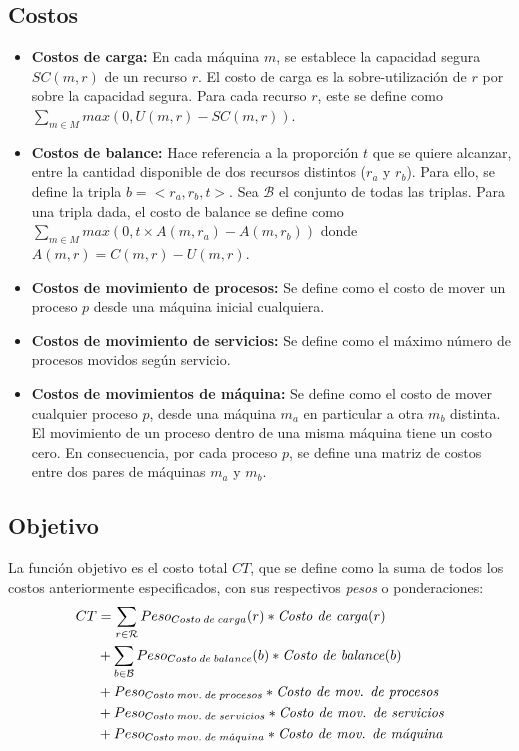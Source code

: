 \subsection{Costos}
\begin{itemize}
	
	\item \textbf{Costos de carga:} En cada máquina $m$, se establece la capacidad segura $SC(m,r)$ de un recurso $r$. El costo de carga es la sobre-utilización de $r$ por sobre la capacidad segura. Para cada recurso $r$, este se define como $\sum_{m \in M}max(0,U(m,r) - SC(m,r))$.
	
	\item \textbf{Costos de balance:} Hace referencia a la proporción $t$ que se quiere alcanzar, entre la cantidad disponible de dos recursos distintos ($r_a$ y $r_b$). Para ello, se define la tripla $b = <r_a,r_b,t>$. Sea $\mathcal{B}$ el conjunto de todas las triplas. Para una tripla dada, el costo de balance se define como $\sum_{m \in M}max(0, t\times A(m,r_a) - A(m,r_b))$ donde $A(m,r) = C(m,r) - U(m,r)$.
	    
	\item \textbf{Costos de movimiento de procesos:} Se define como el costo de mover un proceso $p$ desde una máquina inicial cualquiera. 
	
	\item \textbf{Costos de movimiento de servicios:} Se define como el máximo número de procesos movidos según servicio. 
	
	\item \textbf{Costos de movimientos de máquina:} Se define como el costo de mover cualquier proceso $p$, desde una máquina $m_a$ en particular a otra $m_b$ distinta. El movimiento de un proceso dentro de una misma máquina tiene un costo cero. En consecuencia, por cada proceso $p$, se define una matriz de costos entre dos pares de máquinas $m_a$ y $m_b$.
	
\end{itemize}

\subsection{Objetivo}
La función objetivo es el costo total $CT$, que se define como la suma de todos los costos anteriormente especificados, con sus respectivos \textit{pesos} o ponderaciones:
\begin{align}
	CT &= \sum_{r \in \mathcal{R}}Peso_{Costo \;de\; carga}(r)*\text{\textit{Costo de carga}}(r) \nonumber \\
	   &+ \sum_{b \in \mathcal{B}}Peso_{Costo \;de\; balance}(b)*\text{\textit{Costo de balance}}(b)  \nonumber \\
	   &+ Peso_{Costo \;mov.\; de\; procesos}*\text{\textit{Costo de mov. de procesos}} \nonumber \\
	   &+ Peso_{Costo \;mov.\; de\; servicios}*\text{\textit{Costo de mov. de servicios}} \nonumber \\
	   &+ Peso_{Costo \;mov.\; de\; m\acute{a}quina}*\text{\textit{Costo de mov. de máquina}} \nonumber	
\end{align}

